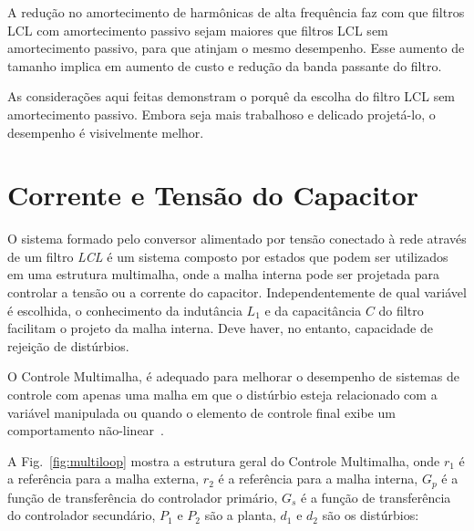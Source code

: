     A redução no amortecimento de harmônicas de alta frequência faz com que filtros
    LCL com amortecimento passivo sejam maiores que filtros LCL sem amortecimento
    passivo, para que atinjam o mesmo desempenho. Esse aumento de tamanho implica
    em aumento de custo e redução da banda passante do filtro.

    As considerações aqui feitas demonstram o porquê da escolha do filtro LCL sem
    amortecimento passivo. Embora seja mais trabalhoso e delicado projetá-lo,
    o desempenho é visivelmente melhor.


\section{Corrente e Tensão do Capacitor}

    O sistema formado pelo conversor alimentado por tensão conectado à rede através
    de um filtro \emph{LCL} é um sistema composto por estados que podem ser
    utilizados em uma estrutura multimalha, onde a malha interna pode ser projetada
    para controlar a tensão ou a corrente do capacitor. Independentemente de qual
    variável é escolhida, o conhecimento da indutância $L_1$ e da capacitância $C$
    do filtro facilitam o projeto da malha interna. Deve haver, no entanto, capacidade
    de rejeição de distúrbios.


    O Controle Multimalha, é adequado para melhorar o desempenho
    de sistemas de controle com apenas uma malha em que o distúrbio esteja
    relacionado com a variável manipulada ou quando o elemento de controle final
    exibe um comportamento não-linear~\cite{ref:LEE}.

    A Fig.~\ref{fig:multiloop} mostra a estrutura geral do Controle Multimalha, onde
    $r_1$ é a referência para a malha externa, $r_2$ é a referência para a malha
    interna, $G_p$ é a função de transferência do controlador primário,
    $G_s$ é a função de transferência do controlador secundário, $P_1$ e $P_2$
    são a planta, $d_1$ e $d_2$ são os distúrbios:


